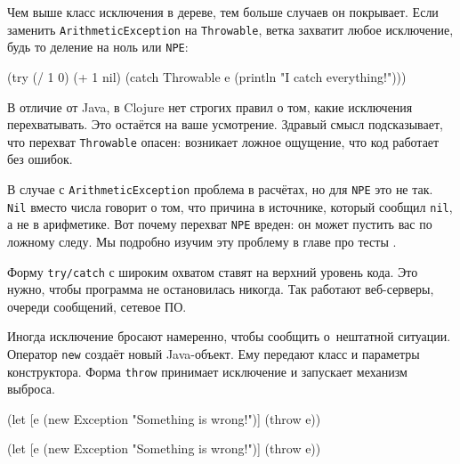 
Чем выше класс исключения в дереве, тем больше случаев он покрывает. Если
заменить \verb|ArithmeticException| на \verb|Throwable|, ветка захватит
любое исключение, будь то деление на ноль или \verb|NPE|:

\begin{english}
  \begin{clojure}
(try
  (/ 1 0)
  (+ 1 nil)
  (catch Throwable e
    (println "I catch everything!")))
  \end{clojure}
\end{english}

В отличие от Java, в Clojure нет строгих правил о том, какие исключения
перехватывать. Это остаётся на ваше усмотрение. Здравый смысл подсказывает, что
перехват \verb|Throwable| опасен: возникает ложное ощущение, что код работает
без ошибок.

В случае с \verb|ArithmeticException| проблема в расчётах, но для \verb|NPE| это
не так. \verb|Nil| вместо числа говорит о том, что причина в источнике, который
сообщил \verb|nil|, а не в арифметике. Вот почему перехват \verb|NPE| вреден: он
может пустить вас по ложному следу. Мы подробно изучим эту проблему в главе про
тесты .

Форму \verb|try/catch| с широким охватом ставят на верхний уровень кода. Это
нужно, чтобы программа не остановилась никогда. Так работают веб-серверы,
очереди сообщений, сетевое ПО.


Иногда исключение бросают намеренно, чтобы сообщить о~нештатной
ситуации. Оператор \verb|new| создаёт новый Java-объект. Ему передают класс и
параметры конструктора. Форма \verb|throw| принимает исключение и запускает
механизм выброса.

\ifx\DEVICETYPE\MOBILE

\begin{english}
  \begin{clojure}
(let [e (new Exception
          "Something is wrong!")]
  (throw e))
  \end{clojure}
\end{english}

\else

\begin{english}
  \begin{clojure}
(let [e (new Exception "Something is wrong!")]
  (throw e))
  \end{clojure}
\end{english}

